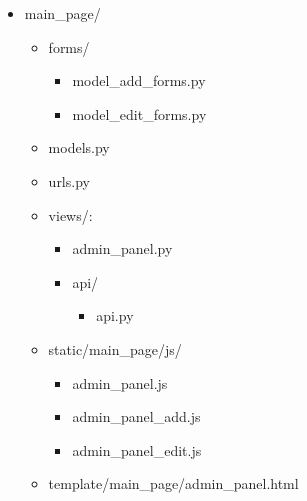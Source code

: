 \documentclass{article}
\begin{document}
\begin{itemize}
	\item[] main\_page/
	\begin{itemize}
		\item[] forms/
		\begin{itemize}
			\item model\_add\_forms.py
			\item model\_edit\_forms.py
		\end{itemize}	
		\item models.py
		\item urls.py
		\item[] views/:
		\begin{itemize}
			\item admin\_panel.py
			\item[] api/
			\begin{itemize}
				\item api.py
			\end{itemize}
		\end{itemize}
		\item[] static/main\_page/js/
		\begin{itemize}
			\item admin\_panel.js
			\item admin\_panel\_add.js
			\item admin\_panel\_edit.js
		\end{itemize}
		\item[] template/main\_page/admin\_panel.html
	\end{itemize}
\end{itemize}
\end{document}
